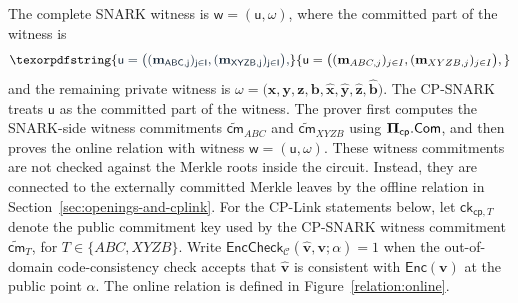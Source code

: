 \documentclass[conference,compsoc]{IEEEtran}
\newcommand{\cm}{\textsf{cm}}
\newcommand{\ck}{\textsf{ck}}
\newcommand{\vect}{\mathbf}         %
\renewcommand{\enc}{\mathsf{Enc}}   %
\newcommand{\bPi}{{\bf \Pi}}
\newcommand{\com}{{\sf Com}}
\newcommand{\cp}{{\mathsf{cp}}}
\renewcommand{\ck}{{\textsf{ck}}}
\newcommand{\wit}{\mathsf{w}}       %
\newcommand{\comwit}{\mathsf{u}}
\theoremstyle{plain}
\theoremstyle{definition}
\theoremstyle{remark}
\providecommand{\DIFaddtex}[1]{{\protect\color{DIFADD} \sf #1}} %
\providecommand{\DIFaddbegin}{} %
\providecommand{\DIFaddend}{} %
\providecommand{\DIFadd}[1]{\texorpdfstring{\DIFaddtex{#1}}{#1}} %
\providecommand{\DIFaddincludegraphics}[2][]{{\color{blue}\fbox{\DIFOincludegraphics[#1]{#2}}}} %
\DeclareRobustCommand{\DIFaddbegin}{\DIFOaddbegin \let\includegraphics\DIFaddincludegraphics} %
\DeclareRobustCommand{\DIFaddend}{\DIFOaddend \let\includegraphics\DIFOincludegraphics} %
\begin{document}
The complete SNARK witness is
  $\wit=(\comwit,\omega)$,
where the committed part of the witness is
 \DIFaddbegin \[
\DIFadd{\comwit = \big( (\vect{m}_{ABC,j})_{j\in I},(\vect{m}_{XYZB,j})_{j\in I} \big),
}\]\DIFaddend 
and the remaining private witness is
   \DIFaddbegin \DIFadd{$\omega
  =
  \big(
    \vect{x},\vect{y},\vect{z},\vect{b},
    \widehat{\vect{x}},\widehat{\vect{y}},\widehat{\vect{z}},
    \widehat{\vect{b}}
  \big).$
}\DIFaddend The CP-SNARK treats \(\comwit\) as the committed part of the witness.  The
prover first computes the SNARK-side witness commitments
\(\widetilde{\cm}_{ABC}\) and  \DIFaddbegin \DIFadd{\(\widetilde{\cm}_{XYZB}\) }\DIFaddend using
\(\bPi_{\cp}.\com\), and then proves the online relation with witness
\(\wit=(\comwit,\omega)\).  These witness commitments are not checked against
the Merkle roots inside the circuit.  Instead, they are connected to the
externally committed Merkle leaves by the offline relation in
Section~\ref{sec:openings-and-cplink}.
For the CP-Link statements below, let \(\ck_{\cp,T}\) denote the public
commitment key used by the CP-SNARK witness commitment
\(\widetilde{\cm}_{T}\), for  \DIFaddbegin \DIFadd{\(T\in\{ABC,XYZB\}\)}\DIFaddend .
Write
  $\mathsf{EncCheck}_{\mathcal{C}}(\widehat{\vect{v}},\vect{v};\alpha)=1$
when the out-of-domain code-consistency check accepts that
\(\widehat{\vect{v}}\) is consistent with \(\enc(\vect{v})\) at the public
point \(\alpha\).  The online relation is defined in
Figure~\ref{relation:online}.
\end{document}
